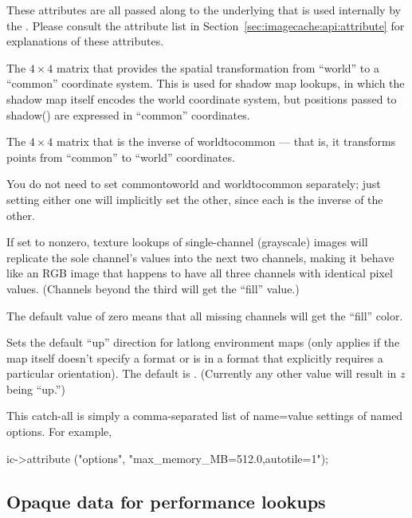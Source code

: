 These attributes are all passed along to the underlying \ImageCache that
is used internally by the \TextureSystem.  Please consult the
\ImageCache attribute list in Section~\ref{sec:imagecache:api:attribute}
for explanations of these attributes.

\apiend

The $4 \times 4$ matrix that provides the spatial transformation
from ``world'' to a ``common'' coordinate system.  This is used for
shadow map lookups, in which the shadow map itself encodes the
world coordinate system, but positions passed to {\cf shadow()} are
expressed in ``common'' coordinates.
\apiend

The $4 \times 4$ matrix that is the inverse of {\cf worldtocommon} ---
that is, it transforms points from ``common'' to ``world'' coordinates.

You do not need to set {\cf commontoworld} and {\cf worldtocommon}
separately; just setting either one will implicitly set the other, since
each is the inverse of the other.
\apiend

If set to nonzero, texture lookups of single-channel (grayscale) 
images will replicate the sole channel's values into the next two
channels, making it behave like an RGB image that happens to have all
three channels with identical pixel values.  (Channels beyond the third
will get the ``fill'' value.)

The default value of zero means that all missing channels will get
the ``fill'' color.
\apiend

Sets the default ``up'' direction for latlong environment maps (only
applies if the map itself doesn't specify a format or is in a format
that explicitly requires a particular orientation).  The default is
.  (Currently any other value will result in $z$ being ``up.'')
\apiend

This catch-all is simply a comma-separated list of {\cf name=value}
settings of named options.  For example,
\begin{code}
        ic->attribute ("options", "max_memory_MB=512.0,autotile=1");
\end{code}
\apiend



\subsection{Opaque data for performance lookups}
\label{sec:texturesys:api:opaque}


